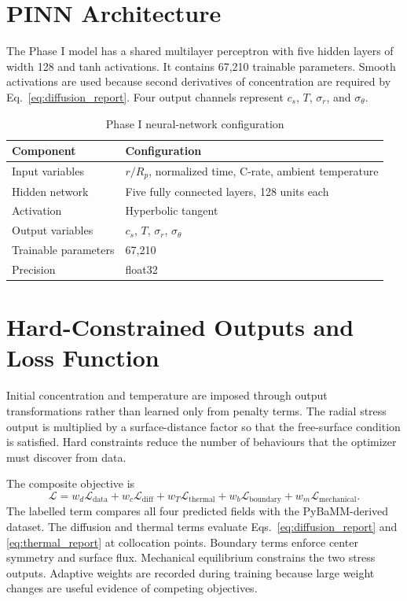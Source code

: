 \documentclass[14pt,a4paper,oneside]{extreport}
\begin{document}
\section{PINN Architecture}
The Phase I model has a shared multilayer perceptron with five hidden layers of width 128 and tanh activations. It contains 67,210 trainable parameters. Smooth activations are used because second derivatives of concentration are required by Eq.~\eqref{eq:diffusion_report}. Four output channels represent $c_s$, $T$, $\sigma_r$, and $\sigma_{\theta}$.

\begin{table}[htbp]
\centering
\caption{Phase I neural-network configuration}
\small
\begin{tabularx}{\textwidth}{p{}X}
\toprule
Component & Configuration\\
\midrule
Input variables & $r/R_p$, normalized time, C-rate, ambient temperature\\
Hidden network & Five fully connected layers, 128 units each\\
Activation & Hyperbolic tangent\\
Output variables & $c_s$, $T$, $\sigma_r$, $\sigma_{\theta}$\\
Trainable parameters & 67,210\\
Precision & float32\\
\bottomrule
\end{tabularx}
\end{table}

\section{Hard-Constrained Outputs and Loss Function}
Initial concentration and temperature are imposed through output transformations rather than learned only from penalty terms. The radial stress output is multiplied by a surface-distance factor so that the free-surface condition is satisfied. Hard constraints reduce the number of behaviours that the optimizer must discover from data.

The composite objective is
\begin{equation}
\mathcal{L}=w_d\mathcal{L}_{\mathrm{data}}+w_c\mathcal{L}_{\mathrm{diff}}
+w_T\mathcal{L}_{\mathrm{thermal}}+w_b\mathcal{L}_{\mathrm{boundary}}
+w_m\mathcal{L}_{\mathrm{mechanical}}.
\end{equation}
The labelled term compares all four predicted fields with the PyBaMM-derived dataset. The diffusion and thermal terms evaluate Eqs.~\eqref{eq:diffusion_report} and \eqref{eq:thermal_report} at collocation points. Boundary terms enforce center symmetry and surface flux. Mechanical equilibrium constrains the two stress outputs. Adaptive weights are recorded during training because large weight changes are useful evidence of competing objectives.
\end{document}
